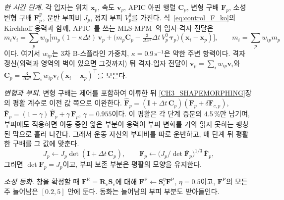 \textit{한 시간 단계.} 각 입자는 위치 $\mathbf{x}_p$, 속도 $\mathbf{v}_p$, APIC 아핀 행렬 $\mathbf{C}_p$, 변형 구배
$\mathbf{F}_p$, 소성 변형 구배 $\mathbf{F}^{\mathrm{P}}_p$, 운반 부피비 $J_p$, 정지 부피 $V^0_p$를 가진다. 식~\eqref{eq:control_F_ko}의
Kirchhoff 응력과 함께, APIC~\citep{jiang2016material}를 쓰는 MLS-MPM~\citep{hu2018mlsmpm}의 입자-격자 전달은
\begin{equation}
\label{ch4:eq_p2g_ko}
m_i\mathbf{v}_i=\sum_p w_{ip}\Big[m_p(1-\kappa\Delta t)\,\mathbf{v}_p
  +\Big(m_p\mathbf{C}_p-\tfrac{3}{\Delta x^{2}}\Delta t\,V^0_p\,\boldsymbol{\tau}_p\Big)(\mathbf{x}_i-\mathbf{x}_p)\Big],
\qquad m_i=\sum_p w_{ip}m_p
\end{equation}
이다. 여기서 $w_{ip}$는 3차 B-스플라인 가중치, $\kappa=0.9\,\mathrm{s}^{-1}$은 약한 주변 항력이다. 격자 갱신(외력과 영역의
벽이 있으면 그것까지) 뒤 격자-입자 전달이 $\mathbf{v}_p=\sum_i w_{ip}\mathbf{v}_i$와
$\mathbf{C}_p=\tfrac{3}{\Delta x^2}\sum_i w_{ip}\mathbf{v}_i(\mathbf{x}_i-\mathbf{x}_p)^{\top}$를 모은다.

\textit{변형과 부피.} 변형 구배는 제어를 포함하여 이류한 뒤 \ref{CH3_SHAPEMORPHING}장의 평활 계수로 이전 값 쪽으로 이완한다.
$\hat{\mathbf{F}}_p=(\mathbf{I}+\Delta t\,\mathbf{C}_p)(\mathbf{F}_p+\delta\mathbf{F}_{c,p})$, $\bar{\mathbf{F}}_p=(1-\gamma)\,\hat{\mathbf{F}}_p+\gamma\,\mathbf{F}_p$,
$\gamma=0.955$이다. 이 평활은 각 단계 증분의 4.5\,\%만 남기며, 부피에도 적용하면 이동 중인 얇은 부분이 응력이 부피 변화를 거의
읽지 못하는 팽창된 막으로 흘러 나간다. 그래서 운동 자신의 부피비를 따로 운반하고, 매 단계 뒤 평활한 구배를 그 값에 맞춘다.
\begin{equation}
\label{ch4:eq_volume_ko}
J_p\leftarrow J_p\det(\mathbf{I}+\Delta t\,\mathbf{C}_p),\qquad
\mathbf{F}_p\leftarrow\big(J_p/\det\bar{\mathbf{F}}_p\big)^{1/3}\,\bar{\mathbf{F}}_p ,
\end{equation}
그러면 $\det\mathbf{F}_p=J_p$이고, 부피 보존 부분은 평활의 모양을 유지한다.

\textit{소성 동화.} 창을 확정할 때 $\mathbf{F}^{\mathrm{E}}=\mathbf{R}_e\mathbf{S}_e$에 대해
$\mathbf{F}^{\mathrm{P}}\leftarrow\mathbf{S}_e^{\eta}\mathbf{F}^{\mathrm{P}}$, $\eta=0.5$이고, $\mathbf{F}^{\mathrm{P}}$의 모든 주
늘어남은 $[0.2,5]$ 안에 둔다. 동화는 늘어남의 부피 부분도 받아들인다.

